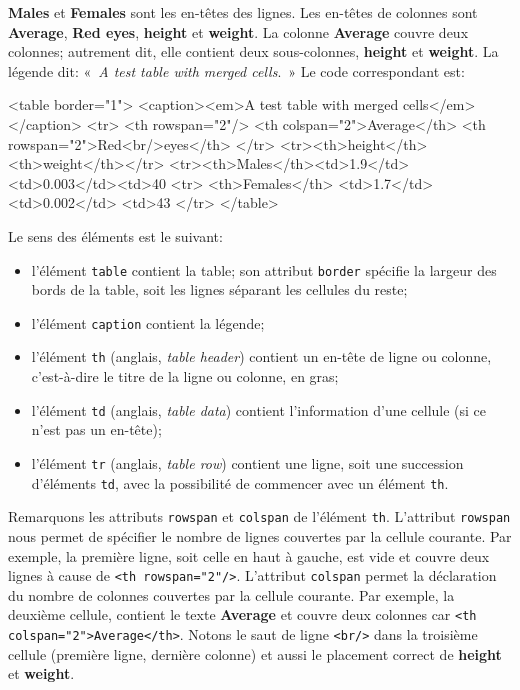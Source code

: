 \textbf{Males} et \textbf{Females} sont les en-têtes des lignes. Les
en-têtes de colonnes sont \textbf{Average}, \textbf{Red eyes},
\textbf{height} et \textbf{weight}.\! La colonne \textbf{Average}
couvre deux colonnes; autrement dit, elle contient deux sous-colonnes,
\textbf{height} et \textbf{weight}. La légende dit: «~\emph{A test
  table with merged cells}.~» Le code \HTML correspondant est:
\begin{sverb}
<table border="1">
  <caption><em>A test table with merged cells</em></caption>
  <tr>
    <th rowspan="2"/>
    <th colspan="2">Average</th>
    <th rowspan="2">Red<br/>eyes</th>
  </tr>
  <tr><th>height</th><th>weight</th></tr>
  <tr><th>Males</th><td>1.9</td><td>0.003</td><td>40%
  <tr>
    <th>Females</th>
    <td>1.7</td>
    <td>0.002</td>
    <td>43%
  </tr>
</table>
\end{sverb}
Le sens des éléments est le suivant:
\begin{itemize}

\item l'élément \texttt{table} contient la table; son attribut
  \texttt{border} spécifie la largeur des bords de la table, soit les
  lignes séparant les cellules du reste;

\item l'élément \texttt{caption} contient la légende;

\item l'élément \texttt{th} (anglais, \emph{table header}) contient un
  en-tête de ligne ou colonne, c'est-à-dire le titre de la ligne ou
  colonne, en gras;

\item l'élément \texttt{td} (anglais, \emph{table data}) contient
  l'information d'une cellule (si ce n'est pas un en-tête);

\item l'élément \texttt{tr} (anglais, \emph{table row}) contient une
  ligne, soit une succession d'éléments \texttt{td}, avec la
  possibilité de commencer avec un élément \texttt{th}.

\end{itemize}
Remarquons les attributs \texttt{rowspan} et \texttt{colspan} de
l'élément \texttt{th}. L'attribut \texttt{rowspan} nous permet de
spécifier le nombre de lignes couvertes par la cellule courante. Par
exemple, la première ligne, soit celle en haut à gauche, est vide et
couvre deux lignes à cause de \verb|<th rowspan="2"/>|. L'attribut
\texttt{colspan} permet la déclaration du nombre de colonnes couvertes
par la cellule courante. Par exemple, la deuxième cellule, contient le
texte \textbf{Average} et couvre deux colonnes car
\verb|<th colspan="2">Average</th>|. Notons le saut de ligne
\verb|<br/>| dans la troisième cellule (première ligne, dernière
colonne) et aussi le placement correct de \textbf{height} et
\textbf{weight}.


